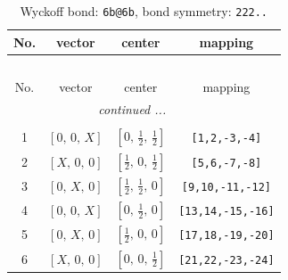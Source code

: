 \documentclass[fleqn,8pt]{jsarticle}
\begin{document}
\renewcommand{\arraystretch}{1.2}
\begin{longtable}{cccc}
\caption{Wyckoff bond: {\tt 6b@6b}, bond symmetry: {\tt 222..}}
 \\
 \hline \hline
No. & vector & center & mapping \\ \hline \endfirsthead

\multicolumn{3}{l}{\tablename\ \thetable{}} \\
 \hline \hline
No. & vector & center & mapping \\ \hline \endhead

 \hline \hline
\multicolumn{3}{r}{\footnotesize\it continued ...} \\ \endfoot

 \hline \hline
\multicolumn{3}{r}{} \\ \endlastfoot

1 & $\left[ 0,\, 0,\, X \right]$ & $\left[ 0,\, \frac{1}{2},\, \frac{1}{2} \right]$ & {\tt [1,2,-3,-4]} \\ \hline
2 & $\left[ X,\, 0,\, 0 \right]$ & $\left[ \frac{1}{2},\, 0,\, \frac{1}{2} \right]$ & {\tt [5,6,-7,-8]} \\ \hline
3 & $\left[ 0,\, X,\, 0 \right]$ & $\left[ \frac{1}{2},\, \frac{1}{2},\, 0 \right]$ & {\tt [9,10,-11,-12]} \\ \hline
4 & $\left[ 0,\, 0,\, X \right]$ & $\left[ 0,\, \frac{1}{2},\, 0 \right]$ & {\tt [13,14,-15,-16]} \\ \hline
5 & $\left[ 0,\, X,\, 0 \right]$ & $\left[ \frac{1}{2},\, 0,\, 0 \right]$ & {\tt [17,18,-19,-20]} \\ \hline
6 & $\left[ X,\, 0,\, 0 \right]$ & $\left[ 0,\, 0,\, \frac{1}{2} \right]$ & {\tt [21,22,-23,-24]} \\
\end{longtable}
\renewcommand{\arraystretch}{1.2}
\end{document}
